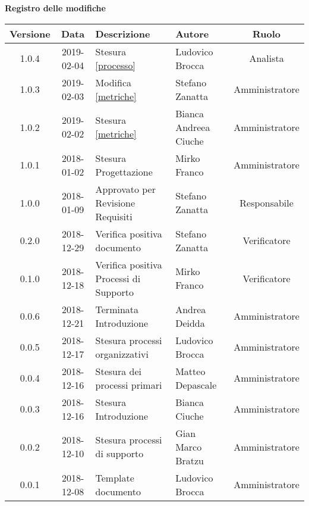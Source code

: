 \begin{center}
	\textbf{Registro delle modifiche}
	\end{center}
	\begin{center}
		\begin{tabularx}{\textwidth}{|c|c|X|X|c|}
			\hline
			\textbf{Versione} & \textbf{Data} & \textbf{Descrizione} & \textbf{Autore} & \textbf{Ruolo} \\
			\hline
			1.0.4&2019-02-04&Stesura \ref{processo}&Ludovico Brocca& Analista\\
			\hline
			1.0.3 & 2019-02-03 & Modifica \ref{metriche} & Stefano Zanatta & Amministratore\\
			\hline
			1.0.2 & 2019-02-02 & Stesura \ref{metriche} & Bianca Andreea Ciuche & Amministratore\\
			\hline
			1.0.1 & 2018-01-02 & Stesura Progettazione & Mirko Franco & Amministratore \\
			\hline
			1.0.0 & 2018-01-09 & Approvato per Revisione Requisiti & Stefano Zanatta & Responsabile\\
			\hline
			0.2.0 & 2018-12-29 & Verifica positiva documento & Stefano Zanatta & Verificatore\\
			\hline
			0.1.0 & 2018-12-18 & Verifica positiva Processi di Supporto & Mirko Franco & Verificatore\\
			\hline
			0.0.6 & 2018-12-21 & Terminata Introduzione & Andrea Deidda & Amministratore\\
			\hline
			0.0.5 & 2018-12-17 & Stesura processi organizzativi & Ludovico Brocca & Amministratore\\
			\hline
			0.0.4 & 2018-12-16 & Stesura dei processi primari & Matteo Depascale & Amministratore\\
			\hline
			0.0.3 & 2018-12-16 & Stesura Introduzione & Bianca Ciuche & Amministratore\\
			\hline
			0.0.2 & 2018-12-10 & Stesura processi di supporto & Gian Marco Bratzu & Amministratore\\	
			\hline
			0.0.1 & 2018-12-08 & Template documento  & Ludovico Brocca & Amministratore\\
			\hline
		\end{tabularx}
	\end{center}

\newpage